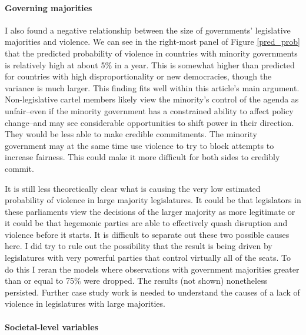 \documentclass[a4paper]{article}\usepackage[]{graphicx}\usepackage[]{color}
\begin{document}
\paragraph{Governing majorities}

I also found a negative relationship between the size of governments' legislative majorities and violence. We can see in the right-most panel of Figure \ref{pred_prob} that the predicted probability of violence in countries with minority governments is relatively high at about 5\% in a year. This is somewhat higher than predicted for countries with high disproportionality or new democracies, though the variance is much larger. This finding fits well within this article's main argument. Non-legislative cartel members likely view the minority's control of the agenda as unfair--even if the minority government has a constrained ability to affect policy change--and may see considerable opportunities to shift power in their direction. They would be less able to make credible commitments. The minority government may at the same time use violence to try to block attempts to increase fairness. This could make it more difficult for both sides to credibly commit.

It is still less theoretically clear what is causing the very low estimated probability of violence in large majority legislatures. It could be that legislators in these parliaments view the decisions of the larger majority as more legitimate or it could be that hegemonic parties are able to effectively quash disruption and violence before it starts. It is difficult to separate out these two possible causes here. I did try to rule out the possibility that the result is being driven by legislatures with very powerful parties that control virtually all of the seats. To do this I reran the models where observations with government majorities greater than or equal to 75\% were dropped. The results (not shown) nonetheless persisted. Further case study work is needed to understand the causes of a lack of violence in legislatures with large majorities.

\paragraph{Societal-level variables}
\end{document}

